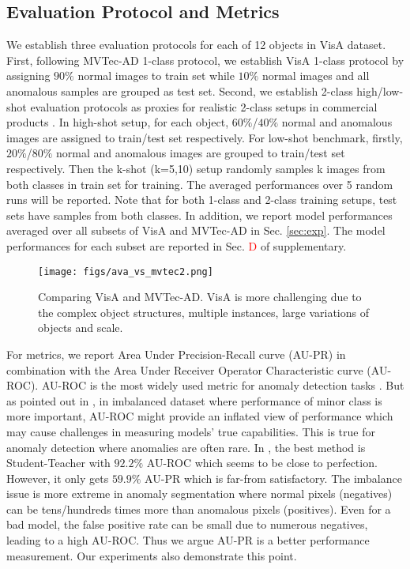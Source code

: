 \documentclass[runningheads]{llncs}
\begin{document}
\subsection{Evaluation Protocol and Metrics}
We establish three evaluation protocols for each of 12 objects in VisA dataset. First, following MVTec-AD 1-class protocol, we establish VisA 1-class protocol by assigning $90\%$ normal images to train set while $10\%$ normal images and all anomalous samples are grouped as test set. Second, we establish 2-class high/low-shot evaluation protocols as proxies for realistic 2-class setups in commercial products \cite{LfV,VIAI}. In high-shot setup, for each object, $60\%$/$40\%$ normal and anomalous images are assigned to train/test set respectively. For low-shot benchmark, firstly, $20\%$/$80\%$ normal and anomalous images are grouped to train/test set respectively. Then the k-shot (k=5,10) setup randomly samples k images from both classes in train set for training. The averaged performances over 5 random runs will be reported. Note that for both 1-class and 2-class training setups, test sets have samples from both classes. In addition, we report model performances averaged over all subsets of VisA and MVTec-AD in Sec. \ref{sec:exp}. The model performances for each subset are reported in Sec. \textcolor{red}{D} of supplementary.

\begin{figure}[!t]
 \centering
\texttt{[image: figs/ava\_vs\_mvtec2.png]}
\caption{Comparing VisA and MVTec-AD. VisA is more challenging due to the complex object structures, multiple instances, large variations of objects and scale.}
\label{fig:ava_vs_mvtec}
\end{figure}

For metrics, we report Area Under Precision-Recall curve (AU-PR) in combination with the Area Under Receiver Operator Characteristic curve (AU-ROC). AU-ROC is the most widely used metric for anomaly detection tasks \cite{defard2021padim,Roth_2022_CVPR,yi2020patch}. But as pointed out in \cite{cook2020consult,davis2006relationship,saito2015precision}, in imbalanced dataset where performance of minor class is more important, AU-ROC might provide an inflated view of performance which may cause challenges in measuring models' true capabilities. This is true for anomaly detection where anomalies are often rare. In \cite{bergmann2021mvtec}, the best method is Student-Teacher \cite{bergmann2020uninformed} with $92.2\%$ AU-ROC which seems to be close to perfection. However, it only gets $59.9\%$ AU-PR which is far-from satisfactory. The imbalance issue is more extreme in anomaly segmentation where normal pixels (negatives) can be tens/hundreds times more than anomalous pixels (positives). Even for a bad model, the false positive rate can be small due to numerous negatives, leading to a high AU-ROC. Thus we argue AU-PR is a better performance measurement. Our experiments also demonstrate this point.
\end{document}
